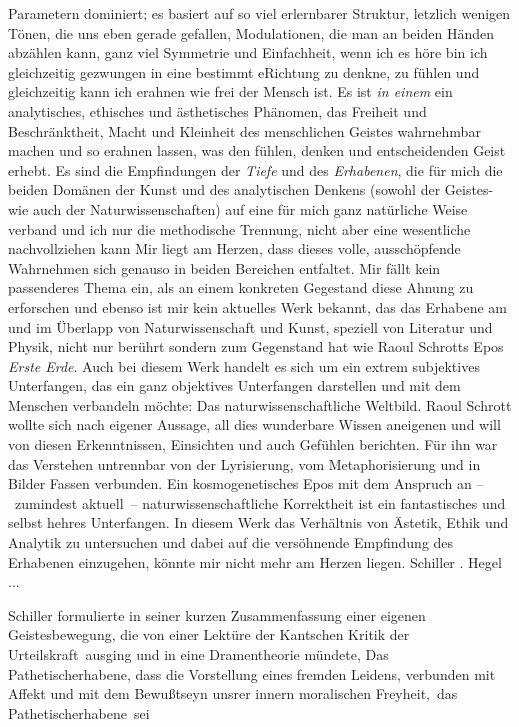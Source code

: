   Parametern dominiert; es basiert auf so viel erlernbarer Struktur, letzlich
  wenigen Tönen, die uns eben gerade gefallen, Modulationen, die man an beiden
  Händen abzählen kann, ganz viel Symmetrie und Einfachheit, wenn ich es höre
  bin ich gleichzeitig gezwungen in eine bestimmt eRichtung zu denkne, zu
  fühlen und gleichzeitig kann ich erahnen wie frei der Mensch ist.
Es ist \emph{in einem} ein analytisches, ethisches und ästhetisches
  Phänomen, das Freiheit und Beschränktheit, Macht und Kleinheit des
  menschlichen Geistes wahrnehmbar machen und so erahnen lassen, was den
  fühlen, denken und entscheidenden Geist erhebt.
Es sind die Empfindungen der \emph{Tiefe} und des \emph{Erhabenen}, die für
  mich die beiden Domänen der Kunst und des analytischen Denkens (sowohl der
  Geistes- wie auch der Naturwissenschaften) auf eine für mich ganz natürliche Weise
  verband und ich nur die methodische Trennung, nicht aber eine wesentliche
  nachvollziehen kann
Mir liegt am Herzen, dass dieses volle, ausschöpfende Wahrnehmen sich genauso
  in beiden Bereichen entfaltet.
Mir fällt kein passenderes Thema ein, als an einem konkreten Gegestand diese
  Ahnung zu erforschen und ebenso ist mir kein aktuelles Werk bekannt, das das
  Erhabene am und im Überlapp von Naturwissenschaft und Kunst, speziell von
  Literatur und Physik, nicht nur berührt sondern zum Gegenstand hat wie Raoul
  Schrotts Epos \emph{Erste Erde}.
Auch bei diesem Werk handelt es sich um ein extrem subjektives Unterfangen,
  das ein ganz objektives Unterfangen darstellen und mit dem Menschen
  verbandeln möchte: Das naturwissenschaftliche Weltbild. Raoul Schrott wollte
  sich nach eigener Aussage, all dies wunderbare Wissen aneigenen und will von
  diesen Erkenntnissen, Einsichten und auch Gefühlen berichten. Für ihn war
  das Verstehen untrennbar von der Lyrisierung, vom Metaphorisierung und in
  Bilder Fassen verbunden. Ein kosmogenetisches Epos mit dem Anspruch an
  --~zumindest aktuell~-- naturwissenschaftliche Korrektheit ist ein
  fantastisches und selbst hehres Unterfangen.
In diesem Werk das Verhältnis von Ästetik, Ethik und Analytik zu untersuchen
  und dabei auf die versöhnende Empfindung des Erhabenen einzugehen, könnte
  mir nicht mehr am Herzen liegen. 
Schiller \citep[S. 4]{SchillerNaiveDichtung}. Hegel ...

Schiller formulierte in seiner kurzen Zusammenfassung einer eigenen
  Geistesbewegung, die von einer Lektüre der Kantschen \glqq Kritik der
  Urteilskraft\grqq\ ausging und in eine Dramentheorie mündete, \glqq Das
  Pathetischerhabene\grqq, dass die \glqq Vorstellung eines fremden Leidens,
  verbunden mit Affekt und mit dem Bewu\ss tseyn unsrer innern moralischen
  Freyheit,\grqq\ das \glqq Pathetischerhabene\grqq\ sei
  \citep[S. ? f.]{SchillerPathetischErhaben}


